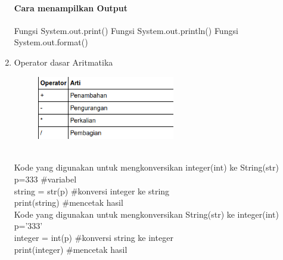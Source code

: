 \begin{enumerate}
	\paragraph*{Cara menampilkan Output} 
	Fungsi System.out.print()
	Fungsi System.out.println()
	Fungsi System.out.format()
	
	\item Operator dasar Aritmatika
	\begin{figure} [h]
	\includegraphics[width=6cm]{pip/aritmatika.png}
	\centering
	\end{figure}\\
	Kode yang digunakan untuk mengkonversikan integer(int) ke String(str)\\
	p=333 \#variabel\\
	string = str(p) \#konversi integer ke string\\ 
	print(string) \#mencetak hasil\\
	Kode yang digunakan untuk mengkonversikan String(str) ke integer(int)\\
	p=’333’\\
	integer = int(p) \#konversi string ke integer\\
	print(integer) \#mencetak hasil\\


\end{enumerate}
